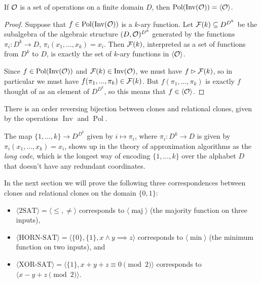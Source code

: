 \documentclass[letterpaper,11pt]{article}
\DeclareMathOperator{\Pol}{Pol}
\DeclareMathOperator{\Inv}{Inv}
\begin{document}
\begin{thm} If $\mathcal{O}$ is a set of operations on a finite domain $D$, then $\Pol(\Inv(\cO)) = \langle \cO \rangle$.
\end{thm}
\begin{proof} Suppose that $f \in \Pol(\Inv(\cO))$ is a $k$-ary function. Let $\mathcal{F}(k) \subseteq D^{D^k}$ be the subalgebra of the algebraic structure $(D,\mathcal{O})^{D^k}$ generated by the functions $\pi_i : D^k \rightarrow D$, $\pi_i(x_1, ..., x_k) = x_i$. Then $\mathcal{F}(k)$, interpreted as a set of functions from $D^k$ to $D$, is exactly the set of $k$-ary functions in $\langle \mathcal{O} \rangle$.

Since $f \in \Pol(\Inv(\cO))$ and $\cF(k) \in \Inv(\cO)$, we must have $f \rhd \mathcal{F}(k)$, so in particular we must have $f(\pi_1, ..., \pi_k) \in \mathcal{F}(k)$. But $f(\pi_1, ..., \pi_k)$ is exactly $f$ thought of as an element of $D^{D^k}$, so this means that $f \in \langle \mathcal{O} \rangle$.
\end{proof}

\begin{cor} There is an order reversing bijection between clones and relational clones, given by the operations $\Inv$ and $\Pol$.
\end{cor}

\begin{rem} The map $\{1, ..., k\} \rightarrow D^{D^k}$ given by $i \mapsto \pi_i$, where $\pi_i : D^k \rightarrow D$ is given by $\pi_i(x_1, ..., x_k) = x_i$, shows up in the theory of approximation algorithms as the \emph{long code}, which is the longest way of encoding $\{1, ..., k\}$ over the alphabet $D$ that doesn't have any redundant coordinates.
\end{rem}

\begin{ex} In the next section we will prove the following three correspondences between clones and relational clones on the domain $\{0,1\}$:
\begin{itemize}
\item $\langle \text{2SAT} \rangle = \langle \le, \ne \rangle$ corresponds to $\langle \operatorname{maj} \rangle$ (the majority function on three inputs),

\item $\langle \text{HORN-SAT} \rangle = \langle \{0\}, \{1\}, x\wedge y\implies z \rangle$ corresponds to $\langle \min \rangle$ (the minimum function on two inputs), and

\item $\langle \text{XOR-SAT} \rangle = \langle \{1\}, x+y+z \equiv 0 \pmod{2} \rangle$ corresponds to $\langle x-y+z \pmod{2} \rangle$.
\end{itemize}
\end{ex}
\end{document}
